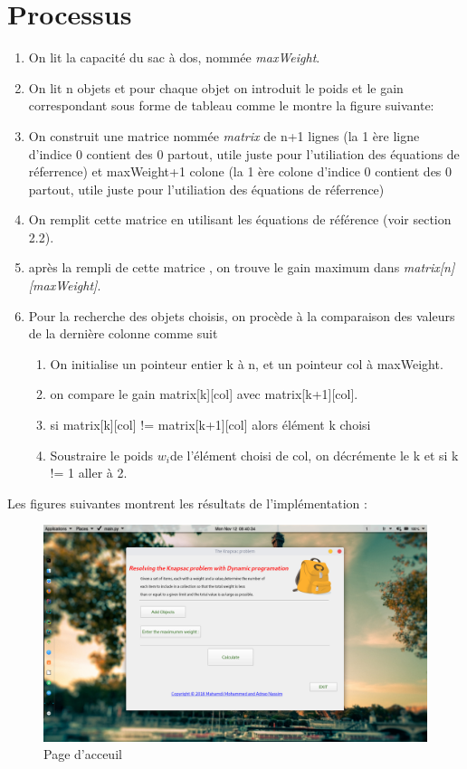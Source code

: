 \documentclass[12pt]{report}
\begin{document}
	\section{Processus}\begin{enumerate}
		\item On lit la capacité du sac à dos, nommée \emph{maxWeight}.
		\item On lit n objets et pour chaque objet on introduit le poids et le gain correspondant sous forme de tableau comme le montre la figure suivante:
		\item On construit une matrice nommée \emph{matrix} de n+1 lignes (la 1 ère ligne d'indice 0 contient des 0 partout, utile juste pour l'utiliation des équations de réferrence) et maxWeight+1 colone (la 1 ère colone d'indice 0 contient des 0 partout, utile juste pour l'utiliation des équations de réferrence)
		\item On remplit cette matrice en utilisant les équations de référence (voir section 2.2).
		\item après la rempli de cette matrice , on trouve le gain maximum dans \emph{matrix[n][maxWeight]}.
		\item Pour la recherche des objets choisis, on procède à la comparaison des valeurs de la dernière colonne comme suit
		\begin{enumerate}
		\item On initialise un pointeur entier k à n, et un pointeur col à  maxWeight.
		\item on compare le gain matrix[k][col] avec matrix[k+1][col].
		\item si matrix[k][col] != matrix[k+1][col] alors élément k choisi
		\item Soustraire le poids $w_{i}$de l'élément choisi de col, on décrémente le k et si k != 1 aller à 2.
		\end{enumerate}
	\end{enumerate}
	\par{}
	Les figures suivantes montrent les résultats de l'implémentation :
	\begin{figure}[hp]
\centering
\includegraphics[scale=1, width=18cm]{../screenshots/1.png}
	\caption{Page d'acceuil}
	\end{figure}
\end{document}
